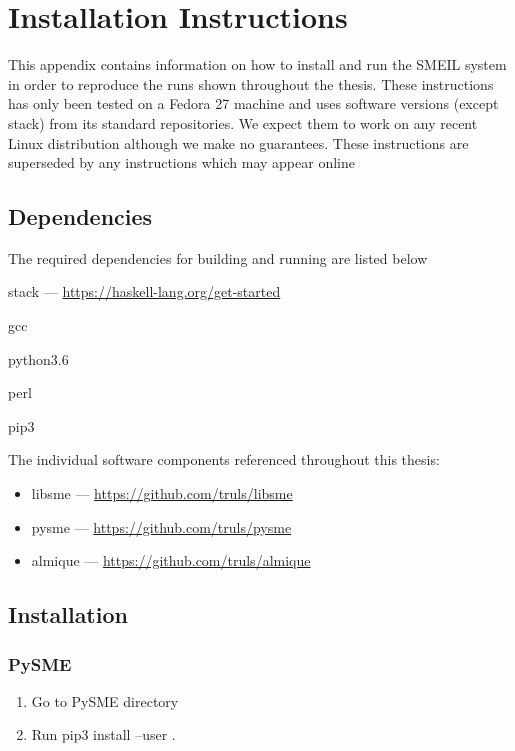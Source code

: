 \chapter{Installation Instructions}
\label{app:inst}

This appendix contains information on how to install and run the SMEIL system in
order to reproduce the runs shown throughout the thesis. These instructions has
only been tested on a Fedora 27 machine and uses software versions (except
stack) from its standard repositories. We expect them to work on any recent
Linux distribution although we make no guarantees. These instructions are
superseded by any instructions which may appear online



\section{Dependencies}
The required dependencies for building and running are listed below
\begin{itemize}
\item {\ttfamily stack} --- \url{https://haskell-lang.org/get-started}
  {\ttfamily 
\item gcc
\item python3.6
\item perl
\item pip3}
\end{itemize}

\noindent The individual software components referenced throughout this thesis:

\begin{itemize}
\item libsme --- \url{https://github.com/truls/libsme}
\item pysme --- \url{https://github.com/truls/pysme}
\item almique --- \url{https://github.com/truls/almique}
\end{itemize}

\section{Installation}
\subsection{PySME}
\begin{enumerate}
\item Go to PySME directory
  \item Run {\ttfamily pip3 install --user .}
\end{enumerate}

